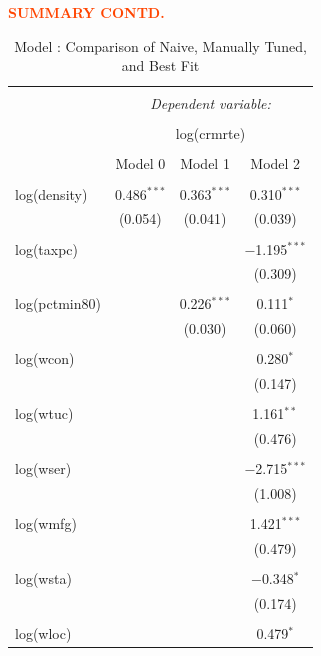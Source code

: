 \pagebreak

\textbf{\textcolor{OrangeRed}{SUMMARY CONTD.}}\\

\begin{table}[!htbp] \centering \tiny
	\caption{Model : Comparison of Naive, Manually Tuned, and Best Fit} 
	\label{} 
	\begin{tabular}{@{\extracolsep{2pt}}lccc} 
		\\[-1.8ex]\hline 
		\hline \\[-1.8ex] 
		& \multicolumn{3}{c}{\textit{Dependent variable:}} \\ 
		\cline{2-4} 
		\\[-1.8ex] & \multicolumn{3}{c}{log(crmrte)} \\ 
		\\[-1.8ex] & Model 0 & Model 1 & Model 2\\ 
		\hline \\[-1.8ex] 
		log(density) & 0.486$^{***}$ & 0.363$^{***}$ & 0.310$^{***}$ \\ 
		& (0.054) & (0.041) & (0.039) \\ 
		& & & \\ 
		log(taxpc) &  &  & $-$1.195$^{***}$ \\ 
		&  &  & (0.309) \\ 
		& & & \\ 
		log(pctmin80) &  & 0.226$^{***}$ & 0.111$^{*}$ \\ 
		&  & (0.030) & (0.060) \\ 
		& & & \\ 
		log(wcon) &  &  & 0.280$^{*}$ \\ 
		&  &  & (0.147) \\ 
		& & & \\ 
		log(wtuc) &  &  & 1.161$^{**}$ \\ 
		&  &  & (0.476) \\ 
		& & & \\ 
		log(wser) &  &  & $-$2.715$^{***}$ \\ 
		&  &  & (1.008) \\ 
		& & & \\ 
		log(wmfg) &  &  & 1.421$^{***}$ \\ 
		&  &  & (0.479) \\ 
		& & & \\ 
		log(wsta) &  &  & $-$0.348$^{*}$ \\ 
		&  &  & (0.174) \\ 
		& & & \\ 
		log(wloc) &  &  & 0.479$^{*}$ \\ 

\end{tabular}
\end{table}
